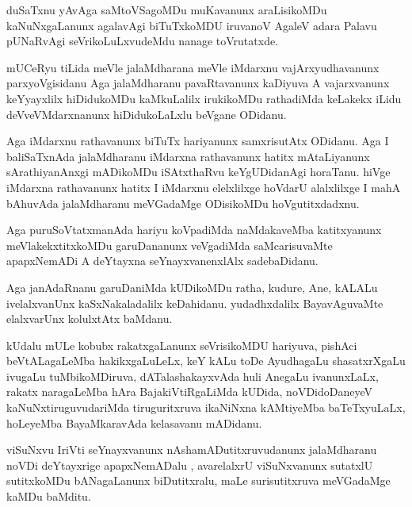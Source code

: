 \documentclass{article}
\begin{document}
\begin{mn}%
duSaTxnu yAvAga saMtoVSagoMDu muKavanunx araLisikoMDu kaNuNxgaLanunx agalavAgi biTuTxkoMDU 
iruvanoV AgaleV adara Palavu pUNaRvAgi seVrikoLuLxvudeMdu nanage toVrutatxde.
\end{mn}

\begin{mn}%
mUCeRyu tiLida meVle jalaMdharana meVle iMdarxnu vajArxyudhavanunx parxyoVgisidanu Aga 
jalaMdharanu pavaRtavanunx kaDiyuva A vajarxvanunx keYyayxlilx hiDidukoMDu kaMkuLalilx 
irukikoMDu rathadiMda keLakekx iLidu deVveVMdarxnanunx hiDidukoLaLxlu beVgane ODidanu.
\end{mn}

\begin{mn}%
Aga iMdarxnu rathavanunx biTuTx hariyanunx samxrisutAtx ODidanu. Aga I baliSaTxnAda 
jalaMdharanu iMdarxna rathavanunx hatitx mAtaLiyanunx sArathiyanAnxgi mADikoMDu iSAtxthaRvu 
keYgUDidanAgi horaTanu. hiVge iMdarxna rathavanunx hatitx I iMdarxnu elelxlilxge hoVdarU 
alalxlilxge I mahA bAhuvAda jalaMdharanu meVGadaMge ODisikoMDu hoVgutitxdadxnu.
\end{mn}

\begin{mn}%
Aga puruSoVtatxmanAda hariyu koVpadiMda naMdakaveMba katitxyanunx meVlakekxtitxkoMDu 
garuDananunx veVgadiMda saMcarisuvaMte apapxNemADi A deYtayxna seYnayxvanenxlAlx 
sadebaDidanu.
\end{mn}

\begin{mn}%
Aga janAdaRnanu garuDaniMda kUDikoMDu ratha, kudure, Ane, kALALu ivelalxvanUnx 
kaSxNakaladalilx keDahidanu. yudadhxdalilx BayavAguvaMte elalxvarUnx kolulxtAtx baMdanu.
\end{mn}

\begin{mn}%
kUdalu mULe kobubx rakatxgaLanunx seVrisikoMDU hariyuva, pishAci beVtALagaLeMba 
hakikxgaLuLeLx, keY kALu toDe AyudhagaLu shasatxrXgaLu ivugaLu tuMbikoMDiruva, 
dATalashakayxvAda huli AnegaLu ivanunxLaLx, rakatx naragaLeMba hAra BajakiVtiRgaLiMda 
kUDida, noVDidoDaneyeV kaNuNxtiruguvudariMda tiruguritxruva ikaNiNxna kAMtiyeMba 
baTeTxyuLaLx, hoLeyeMba BayaMkaravAda kelasavanu mADidanu.
\end{mn}

\begin{mn}%
viSuNxvu IriVti seYnayxvanunx nAshamADutitxruvudanunx jalaMdharanu noVDi deYtayxrige 
apapxNemADalu , avarelalxrU viSuNxvanunx sutatxlU sutitxkoMDu bANagaLanunx biDutitxralu, 
maLe surisutitxruva meVGadaMge kaMDu baMditu.
\end{mn}
\end{document}
